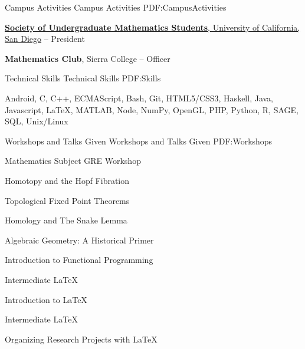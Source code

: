\documentclass[letterpaper,MMMyyyy,nonstopmode]{simpleresumecv}
\begin{document}
\begin{Body}
\Gap

\Section
{Campus Activities}
{Campus Activities}
{PDF:CampusActivities}

\Entry
\href{http://sums.ucsd.edu}
{\textbf{Society of Undergraduate Mathematics Students}, University of California, San Diego}
\hfill{} --
\Gap
\BulletItem President

\BigGap

\Entry
{\textbf{Mathematics Club}, Sierra College}
\hfill
{} --
\Gap
\BulletItem Officer







\Section
{Technical Skills}
{Technical Skills}
{PDF:Skills}

\Entry
Android,
C,
C++,
ECMAScript,
Bash,
Git,
HTML5/CSS3,
Haskell,
Java,
Javascript,
{\LaTeX},
MATLAB,
Node,
NumPy,
OpenGL,
PHP,
Python,
R,
SAGE,
SQL,
Unix/Linux


\Section
{Workshops and Talks Given}
{Workshops and Talks Given}
{PDF:Workshops}

\BulletItem
Mathematics Subject GRE Workshop
\hfill {}

\BulletItem
Homotopy and the Hopf Fibration
\hfill {}

\BulletItem
Topological Fixed Point Theorems
\hfill {}

\BigGap

\BulletItem
Homology and The Snake Lemma
\hfill {}

\BulletItem
Algebraic Geometry: A Historical Primer
\hfill {}

\BulletItem
Introduction to Functional Programming
\hfill {}

\BulletItem
Intermediate LaTeX
\hfill {}

\BulletItem
Introduction to LaTeX
\hfill {}

\BulletItem
Intermediate LaTeX
\hfill {}

\BulletItem
Organizing Research Projects with LaTeX
\hfill {}


\end{Body}
\end{document}
